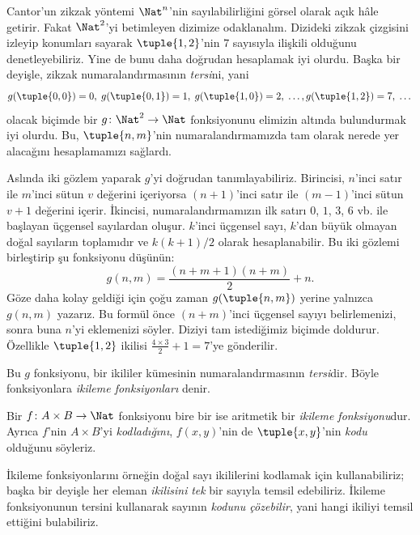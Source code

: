 \documentclass[../../../include/open-logic-section]{subfiles}
\begin{document}

\begin{explain}
Cantor'un zikzak yöntemi $\Nat^n$'nin sayılabilirliğini görsel olarak açık
hâle getirir. Fakat $\Nat^2$'yi betimleyen dizimize odaklanalım. Dizideki
zikzak çizgisini izleyip konumları sayarak $\tuple{1,2}$'nin $7$ sayısıyla
ilişkili olduğunu denetleyebiliriz. Yine de bunu daha doğrudan hesaplamak iyi
olurdu. Başka bir deyişle, zikzak numaralandırmasının
\emph{tersi}ni, yani
\[
g(\tuple{0,0}) = 0, \;
g(\tuple{0,1}) = 1, \;
g(\tuple{1,0}) = 2, \; \dots,
g(\tuple{1,2}) = 7, \; \dots
\]
olacak biçimde bir $g\colon \Nat^2 \to \Nat$ fonksiyonunu elimizin altında
bulundurmak iyi olurdu. Bu, $\tuple{n,m}$'nin numaralandırmamızda tam olarak
nerede yer alacağını hesaplamamızı sağlardı.

Aslında iki gözlem yaparak $g$'yi doğrudan tanımlayabiliriz. Birincisi,
$n$'inci satır ile $m$'inci sütun $v$ değerini içeriyorsa $(n+1)$'inci satır
ile $(m-1)$'inci sütun $v+1$ değerini içerir. İkincisi,
numaralandırmamızın ilk satırı $0$, $1$, $3$, $6$ vb. ile başlayan üçgensel
sayılardan oluşur. $k$'inci üçgensel sayı, $k$'dan büyük olmayan doğal
sayıların toplamıdır ve $k(k+1)/2$ olarak hesaplanabilir. Bu iki gözlemi birleştirip şu
fonksiyonu düşünün:
\[
  g(n,m) = \frac{(n+m+1)(n+m)}{2} + n.
\]
Göze daha kolay geldiği için çoğu zaman $g(\tuple{n,m})$ yerine yalnızca
$g(n,m)$ yazarız. Bu formül önce $(n+m)$'inci üçgensel sayıyı belirlemenizi,
sonra buna $n$'yi eklemenizi söyler. Diziyi tam istediğimiz biçimde doldurur.
Özellikle $\tuple{1,2}$ ikilisi $\frac{4 \times 3}{2}+1=7$'ye gönderilir.

Bu $g$ fonksiyonu, bir ikililer kümesinin numaralandırmasının
\emph{tersi}dir. Böyle fonksiyonlara \emph{ikileme fonksiyonları} denir.
\end{explain}

\begin{defn}
  Bir $f\colon A \times B \to \Nat$ fonksiyonu bire bir ise aritmetik bir
  \emph{ikileme fonksiyonu}dur. Ayrıca $f$'nin $A \times B$'yi
  \emph{kodladığını}, $f(x,y)$'nin de $\tuple{x,y}$'nin \emph{kodu}
  olduğunu söyleriz.
\end{defn}

\begin{explain}
İkileme fonksiyonlarını örneğin doğal sayı ikililerini kodlamak için
kullanabiliriz; başka bir deyişle her eleman \emph{ikilisini} \emph{tek} bir
sayıyla temsil edebiliriz. İkileme fonksiyonunun tersini kullanarak sayının
\emph{kodunu çözebilir}, yani hangi ikiliyi temsil ettiğini bulabiliriz.
\end{explain}
\end{document}
